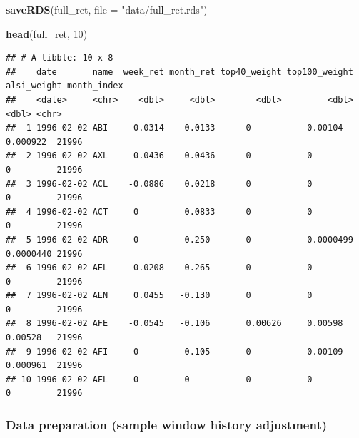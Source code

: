 \documentclass[
]{article}
\newenvironment{Shaded}{\begin{snugshade}}{\end{snugshade}}
\newcommand{\DataTypeTok}[1]{\textcolor[rgb]{0.13,0.29,0.53}{#1}}
\newcommand{\DecValTok}[1]{\textcolor[rgb]{0.00,0.00,0.81}{#1}}
\newcommand{\KeywordTok}[1]{\textcolor[rgb]{0.13,0.29,0.53}{\textbf{#1}}}
\newcommand{\NormalTok}[1]{#1}
\newcommand{\StringTok}[1]{\textcolor[rgb]{0.31,0.60,0.02}{#1}}
\begin{document}
\begin{Shaded}
\begin{Highlighting}[]
\KeywordTok{saveRDS}\NormalTok{(full\_ret, }\DataTypeTok{file =} \StringTok{"data/full\_ret.rds"}\NormalTok{)}

\KeywordTok{head}\NormalTok{(full\_ret, }\DecValTok{10}\NormalTok{)}
\end{Highlighting}
\end{Shaded}

\begin{verbatim}
## # A tibble: 10 x 8
##    date       name  week_ret month_ret top40_weight top100_weight alsi_weight month_index
##    <date>     <chr>    <dbl>     <dbl>        <dbl>         <dbl>       <dbl> <chr>      
##  1 1996-02-02 ABI    -0.0314    0.0133      0           0.00104     0.000922  21996      
##  2 1996-02-02 AXL     0.0436    0.0436      0           0           0         21996      
##  3 1996-02-02 ACL    -0.0886    0.0218      0           0           0         21996      
##  4 1996-02-02 ACT     0         0.0833      0           0           0         21996      
##  5 1996-02-02 ADR     0         0.250       0           0.0000499   0.0000440 21996      
##  6 1996-02-02 AEL     0.0208   -0.265       0           0           0         21996      
##  7 1996-02-02 AEN     0.0455   -0.130       0           0           0         21996      
##  8 1996-02-02 AFE    -0.0545   -0.106       0.00626     0.00598     0.00528   21996      
##  9 1996-02-02 AFI     0         0.105       0           0.00109     0.000961  21996      
## 10 1996-02-02 AFL     0         0           0           0           0         21996
\end{verbatim}

\hypertarget{data-preparation-sample-window-history-adjustment}{%
\subsubsection{Data preparation (sample window history adjustment)}\label{data-preparation-sample-window-history-adjustment}}
\end{document}
